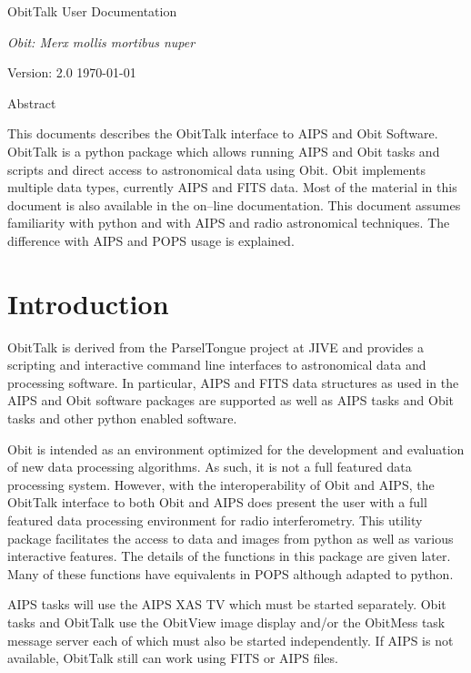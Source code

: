 \documentclass[11pt]{report}
\begin{document}
\setcounter{chapter}{1}

\topskip 1.5in
\centerline{\ttlfont ObitTalk User Documentation }
\vskip 1cm
\centerline{\LARGE\it Obit: Merx mollis mortibus nuper}
\vskip 3cm
\centerline{\secfont Version: 2.0 \today}
\vskip 1cm

\centerline{\secfont Abstract}
This documents describes the ObitTalk interface to AIPS and Obit
Software.
ObitTalk is a python package which allows running AIPS and Obit tasks
and scripts and direct access to astronomical data using Obit.
Obit implements multiple data types, currently AIPS and FITS data.
Most of the material in this document is also available in the on--line 
documentation.
This document assumes familiarity with python and with AIPS and radio
astronomical techniques.
The difference with AIPS and POPS usage is explained.
\clearpage
\topskip 0in
\newpage 
\tableofcontents
\newpage

\section {Introduction}
   ObitTalk is derived from the ParselTongue project at JIVE and
provides a scripting and interactive command line interfaces to
astronomical data and processing software.  In particular, AIPS and
FITS data structures as used in the AIPS and Obit software packages
are supported as well as AIPS tasks and Obit tasks and other python
enabled software.

Obit is intended as an environment optimized for the development and
evaluation of new data processing algorithms.
As such, it is not a full featured data processing system.
However, with the interoperability of Obit and AIPS, the ObitTalk
interface to both Obit and AIPS does present the user with a full
featured data processing environment for radio interferometry.
This utility  package facilitates the access to data and images from
python as well as various interactive features.  
The details of the functions in this package are given later.  
Many of these functions have equivalents in POPS although adapted to
python. 

   AIPS tasks will use the AIPS XAS TV which must be started separately.
Obit tasks and ObitTalk use the ObitView image display and/or the
ObitMess task message server each of which must also be started
independently. 
If AIPS is not available, ObitTalk still can work using FITS or AIPS
files. 
\end{document}
